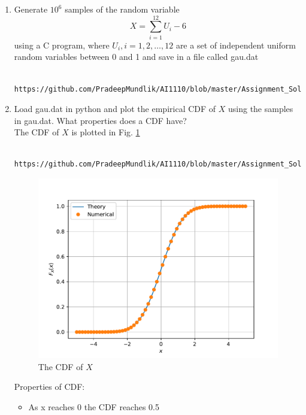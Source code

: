 \documentclass[journal,12pt,twocolumn]{IEEEtran}
\renewcommand\thesection{\arabic{section}}
\begin{document}
\begin{enumerate}[label=\thesection.\arabic*
,ref=\thesection.\theenumi]

%
\item
Generate $10^6$ samples of the random variable
%
\begin{equation}
X = \sum_{i=1}^{12}U_i -6
\end{equation}
%
using a C program, where $U_i, i = 1,2,\dots, 12$ are  a set of independent uniform random variables between 0 and 1
and save in a file called gau.dat \\
\solution 
\begin{lstlisting}
	https://github.com/PradeepMundlik/AI1110/blob/master/Assignment_Soln/codes/2/q2_1.c
\end{lstlisting}
%
\item
Load gau.dat in python and plot the empirical CDF of $X$ using the samples in gau.dat. What properties does a CDF have?
\\
\solution The CDF of $X$ is plotted in Fig. \ref{fig:gauss_cdf} \\
\begin{lstlisting}
	https://github.com/PradeepMundlik/AI1110/blob/master/Assignment_Soln/codes/2/cdf_plot.py
\end{lstlisting}
\begin{figure}[h]
\centering
\includegraphics[width=\columnwidth]{figs/2/gau_cdf.pdf}
\caption{The CDF of $X$}
\label{fig:gauss_cdf}
\end{figure}
Properties of CDF:
\begin{itemize}
	\item As x reaches 0 the CDF reaches 0.5 

\end{itemize}
\end{enumerate}
\end{document}
